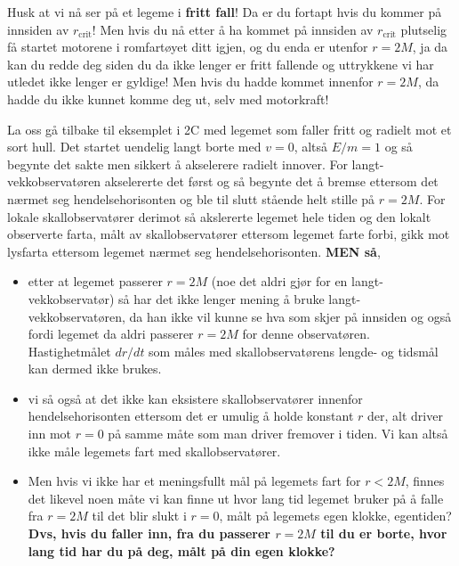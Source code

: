 \documentclass{beamer}
\newcommand{\pagebutton}[1]{\setbeamertemplate{button}{\tikz\node[inner xsep = 5pt, draw = structure!90, fill = green(ryb), rounded corners = 8pt]{\color{amber}\Large\insertbuttontext};}\beamerbutton{#1}}
\begin{document}
\begin{frame}
{
Husk at vi nå ser på et legeme i {\bf fritt fall}! Da er du fortapt hvis du kommer på innsiden av $r_\mathrm{crit}$! Men hvis du nå etter å ha kommet på innsiden av $r_\mathrm{crit}$ plutselig få startet motorene i romfartøyet ditt igjen, og du enda er utenfor $r=2M$, ja da kan du redde deg siden du da ikke lenger er fritt fallende og uttrykkene vi har utledet ikke lenger er gyldige! Men hvis du hadde kommet innenfor $r=2M$, da hadde du ikke kunnet komme deg ut, selv med motorkraft!
\hyperlink{skra31}{\pagebutton{SIDE 64/70/84}}}

{
La oss gå tilbake til eksemplet i 2C med legemet som faller fritt og radielt mot et sort hull. Det startet uendelig langt borte med $v=0$, altså $E/m=1$ og så begynte det sakte men sikkert å akselerere radielt innover. For langt-vekkobservatøren akselererte det først og så begynte det å bremse ettersom det nærmet seg hendelsehorisonten og ble til slutt stående helt stille på $r=2M$. For lokale skallobservatører derimot så akslererte legemet hele tiden og den lokalt observerte farta, målt av skallobservatører ettersom legemet farte forbi, gikk mot lysfarta ettersom legemet nærmet seg hendelsehorisonten. {\bf MEN så},
\begin{itemize}
\item etter at legemet passerer $r=2M$ (noe det aldri gjør for en langt-vekkobservatør) så har det ikke lenger mening å bruke langt-vekkobservatøren, da han ikke vil kunne se hva som skjer på innsiden og også fordi legemet da aldri passerer $r=2M$ for denne observatøren. Hastighetmålet $dr/dt$ som måles med skallobservatørens lengde- og tidsmål kan dermed ikke brukes.
\item vi så også at det ikke kan eksistere skallobservatører innenfor hendelsehorisonten ettersom det er umulig å holde konstant $r$ der, alt driver inn mot $r=0$ på samme måte som man driver fremover i tiden. Vi kan altså ikke måle legemets fart med skallobservatører.
\item Men hvis vi ikke har et meningsfullt mål på legemets fart for $r<2M$, finnes det likevel noen måte vi kan finne ut hvor lang tid legemet bruker på å falle fra $r=2M$ til det blir slukt i $r=0$, målt på legemets egen klokke, egentiden? {\bf Dvs, hvis du faller inn, fra du passerer $r=2M$ til du er borte, hvor lang tid har du på deg, målt på din egen klokke?}
\end{itemize}
\hyperlink{skra32}{\pagebutton{SIDE 65/70/84}}}




\end{frame}
\end{document}
